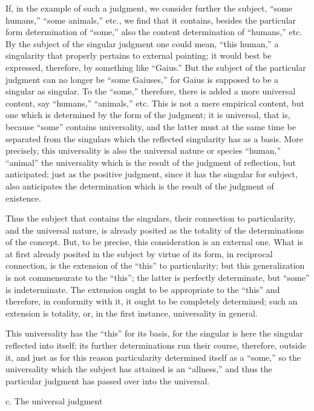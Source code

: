 If, in the example of such a judgment,
we consider further the subject,
“some humans,” “some animals,” etc.,
we find that it contains,
besides the particular form determination of “some,”
also the content determination of “humans,” etc.
By the subject of the singular judgment one could mean,
“this human,” a singularity that properly pertains to external pointing;
it would best be expressed, therefore, by something like “Gaius.”
But the subject of the particular judgment
can no longer be “some Gaiuses,”
for Gaius is supposed to be a singular as singular.
To the “some,” therefore, there is added a more universal content,
say “humans,” “animals,” etc.
This is not a mere empirical content,
but one which is determined by the form of the judgment;
it is universal, that is, because “some” contains universality,
and the latter must at the same time be separated
from the singulars which the reflected singularity has as a basis.
More precisely, this universality is also the universal nature
or species “human,” “animal”
the universality which is the result of
the judgment of reflection, but anticipated;
just as the positive judgment,
since it has the singular for subject,
also anticipates the determination
which is the result of the judgment of existence.

Thus the subject that contains the singulars,
their connection to particularity,
and the universal nature,
is already posited as the totality of
the determinations of the concept.
But, to be precise, this consideration is an external one.
What is at first already posited in the subject
by virtue of its form, in reciprocal connection,
is the extension of the “this” to particularity;
but this generalization is not commensurate to the “this”;
the latter is perfectly determinate,
but “some” is indeterminate.
The extension ought to be appropriate to the “this”
and therefore, in conformity with it,
it ought to be completely determined;
such an extension is totality,
or, in the first instance,
universality in general.

This universality has the “this” for its basis,
for the singular is here the singular reflected into itself;
its further determinations run their course,
therefore, outside it, and just as for this reason
particularity determined itself as a “some,”
so the universality which the subject has attained
is an “allness,” and thus the particular judgment
has passed over into the universal.

c. The universal judgment

